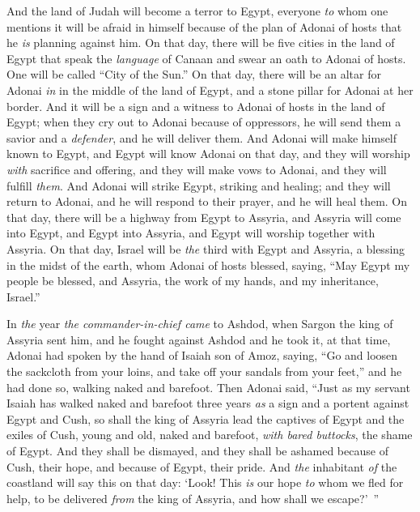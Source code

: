 \begin{biblechapter}
\verse And the land of Judah will become a terror to Egypt, everyone \textit{to} whom one mentions it will be afraid in himself because of the plan of Adonai of hosts that he \textit{is} planning against him.
\verse On that day, there will be five cities in the land of Egypt that speak the \textit{language} of Canaan and swear an oath to Adonai of hosts. One will be called “City of the Sun.”
\verse On that day, there will be an altar for Adonai \textit{in} in the middle of the land of Egypt, and a stone pillar for Adonai at her border.
\verse And it will be a sign and a witness to Adonai of hosts in the land of Egypt; when they cry out to Adonai because of oppressors, he will send them a savior and a \textit{defender}, and he will deliver them.
\verse And Adonai will make himself known to Egypt, and Egypt will know Adonai on that day, and they will worship \textit{with} sacrifice and offering, and they will make vows to Adonai, and they will fulfill \textit{them}.
\verse And Adonai will strike Egypt, striking and healing; and they will return to Adonai, and he will respond to their prayer, and he will heal them.
\verse On that day, there will be a highway from Egypt to Assyria, and Assyria will come into Egypt, and Egypt into Assyria, and Egypt will worship together with Assyria.
\verse On that day, Israel will be \textit{the} third with Egypt and Assyria, a blessing in the midst of the earth,
\verse whom Adonai of hosts blessed, saying, “May Egypt my people be blessed, and Assyria, the work of my hands, and my inheritance, Israel.”
\end{biblechapter}

\begin{biblechapter} %
 In \textit{the} year \textit{the commander-in-chief came} to Ashdod, when Sargon the king of Assyria sent him, and he fought against Ashdod and he took it,
\verse at that time, Adonai had spoken by the hand of Isaiah son of Amoz, saying, “Go and loosen the sackcloth from your loins, 
and take off your sandals from your feet,” and he had done so, walking naked and barefoot.
\verse Then Adonai said, “Just as my servant Isaiah has walked naked and barefoot three years \textit{as} a sign and a portent against Egypt and Cush,
\verse so shall the king of Assyria lead the captives of Egypt and the exiles of Cush, young and old, naked and barefoot, \textit{with bared buttocks}, the shame of Egypt.
\verse And they shall be dismayed, 
and they shall be ashamed 
because of Cush, their hope, 
and because of Egypt, their pride.
\verse And \textit{the} inhabitant \textit{of} the coastland will say this on that day: ‘Look! This \textit{is} our hope \textit{to} whom we fled for help, to be delivered \textit{from} the king of Assyria, and how shall we escape?’ ”
\end{biblechapter}

